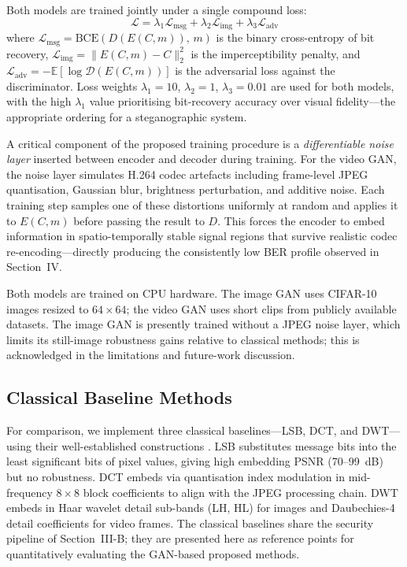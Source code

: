 \documentclass[conference]{IEEEtran}
\begin{document}
Both models are trained jointly under a single compound loss:
\begin{equation}
\mathcal{L} = \lambda_1\mathcal{L}_{\text{msg}}
            + \lambda_2\mathcal{L}_{\text{img}}
            + \lambda_3\mathcal{L}_{\text{adv}}
\label{eq_loss}
\end{equation}
where $\mathcal{L}_{\text{msg}} = \text{BCE}(D(E(C,m)),\,m)$ is the
binary cross-entropy of bit recovery,
$\mathcal{L}_{\text{img}} = \|E(C,m)-C\|_2^2$ is the imperceptibility
penalty, and
$\mathcal{L}_{\text{adv}} = -\mathbb{E}[\log\mathcal{D}(E(C,m))]$
is the adversarial loss against the discriminator.
Loss weights $\lambda_1{=}10$, $\lambda_2{=}1$, $\lambda_3{=}0.01$
are used for both models, with the high $\lambda_1$ value
prioritising bit-recovery accuracy over visual fidelity—the
appropriate ordering for a steganographic system.

A critical component of the proposed training procedure is a
\textit{differentiable noise layer} inserted between encoder and
decoder during training. For the video GAN, the noise layer
simulates H.264 codec artefacts including frame-level JPEG
quantisation, Gaussian blur, brightness perturbation, and additive
noise. Each training step samples one of these distortions uniformly
at random and applies it to $E(C,m)$ before passing the result to
$D$. This forces the encoder to embed information in
spatio-temporally stable signal regions that survive realistic
codec re-encoding—directly producing the consistently low BER profile
observed in Section~IV.

Both models are trained on CPU hardware. The image GAN uses
CIFAR-10 images resized to $64{\times}64$; the video GAN uses short
clips from publicly available datasets. The image GAN is presently
trained without a JPEG noise layer, which limits its still-image
robustness gains relative to classical methods; this is acknowledged
in the limitations and future-work discussion.

\subsection{Classical Baseline Methods}

For comparison, we implement three classical baselines—LSB, DCT, and
DWT—using their well-established constructions \cite{b9}. LSB
substitutes message bits into the least significant bits of pixel
values, giving high embedding PSNR (70–99~dB) but no robustness.
DCT embeds via quantisation index modulation in mid-frequency
$8{\times}8$ block coefficients to align with the JPEG processing
chain. DWT embeds in Haar wavelet detail sub-bands (LH, HL) for
images and Daubechies-4 detail coefficients for video frames. The
classical baselines share the security pipeline of Section~III-B;
they are presented here as reference points for quantitatively
evaluating the GAN-based proposed methods.
\end{document}

